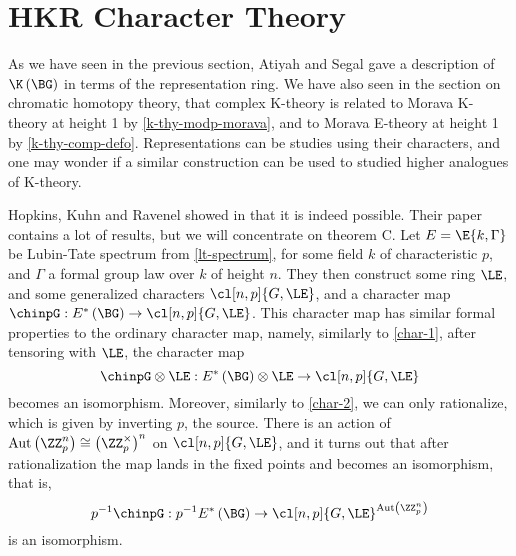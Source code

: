 \section{HKR Character Theory}

As we have seen in the previous section, Atiyah and Segal gave a description of $\K\left(\BG\right)$ in terms of the representation ring.
We have also seen in the section on chromatic homotopy theory, that complex K-theory is related to Morava K-theory at height 1 by \ref{k-thy-modp-morava}, and to Morava E-theory at height 1 by \ref{k-thy-comp-defo}.
Representations can be studies using their characters, and one may wonder if a similar construction can be used to studied higher analogues of K-theory.

Hopkins, Kuhn and Ravenel showed in \cite{HKR} that it is indeed possible.
Their paper contains a lot of results, but we will concentrate on theorem C.
Let $E = \E{k, \Gamma}$ be Lubin-Tate spectrum from \ref{lt-spectrum}, for some field $k$ of characteristic $p$, and $\Gamma$ a formal group law over $k$ of height $n$. 
They then construct some ring $\LE$, and some generalized characters $\cl[n,p]{G, \LE}$, and a character map $\chinpG: E^*\left(\BG\right) \to \cl[n,p]{G, \LE}$.
This character map has similar formal properties to the ordinary character map, namely, similarly to \ref{char-1}, after tensoring with $\LE$, the character map
$$
\chinpG \otimes \LE:
E^*\left(\BG\right) \otimes \LE
\to \cl[n,p]{G, \LE}
$$
becomes an isomorphism.
Moreover, similarly to \ref{char-2}, we can only rationalize, which is given by inverting $p$, the source.
There is an action of $\aut\left(\ZZ_p^n\right) \cong \left(\ZZ_p^\times\right)^n$ on $\cl[n,p]{G, \LE}$, and it turns out that after rationalization the map lands in the fixed points and becomes an isomorphism, that is,
$$
p^{-1} \chinpG:
p^{-1} E^*\left(\BG\right)
\to \cl[n,p]{G, \LE}^{\aut\left(\ZZ_p^n\right)}
$$
is an isomorphism.
